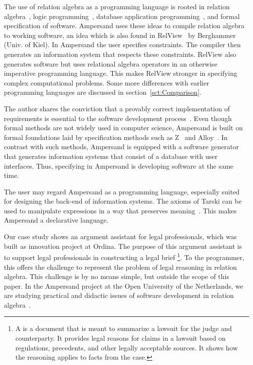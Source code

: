 \documentclass{elsarticle}
\begin{document}
	The use of relation algebra as a programming language is rooted in relation algebra~\cite{Maddux06}, logic programming~\cite{Lloyd1984},
	database application programming~\cite{Codd70}, and formal specification of software.
	Ampersand uses these ideas to compile relation algebra to working software, an idea which is also found in RelView~\cite{Berghammer2005} by Berghammer (Univ. of Kiel).
 	In Ampersand the user specifies constraints. The compiler then generates an information system that respects these constraints.
	RelView also generates software but uses relational algebra operators in an otherwise imperative programming language.
	This makes RelView stronger in specifying complex computational problems.
	Some more differences with earlier programming languages are discussed in section~\ref{sct:Comparison}.

	The author shares the conviction that a provably correct implementation of requirements is essential to the software development process~\cite{Boehm1981}.
	Even though formal methods are not widely used in computer science,
        Ampersand is built on formal foundations laid by specification methods such as Z~\cite{Z} and Alloy~\cite{Alloy2006}.
	In contrast with such methods,
	Ampersand is equipped with a software generator that generates information systems that consist of a database with user interfaces.
	Thus, specifying in Ampersand is developing software at the same time.

	The user may regard Ampersand as a programming language, especially suited for designing the back-end of information systems.
	The axioms of Tarski can be used to manipulate expressions in a way that preserves meaning~\cite{vdWoude2011}.
	This makes Ampersand a declarative language.

	Our case study shows an argument assistant for legal professionals, which was built as innovation project at Ordina.
	The purpose of this argument assistant is to support legal professionals in constructing a legal brief%
\footnote{A  is a document that is meant to summarize a lawsuit for the judge and counterparty.
	It provides legal reasons for claims in a lawsuit based on regulations, precedents, and other legally acceptable sources.
	It shows how the reasoning applies to facts from the case.}.
	To the programmer, this offers the challenge to represent the problem of legal reasoning in relation algebra.
	This challenge is by no means simple, but outside the scope of this paper.
	In the Ampersand project at the Open University of the Netherlands,
	we are studying practical and didactic issues of software development in relation algebra~\cite{Michels2015}.
\end{document}
